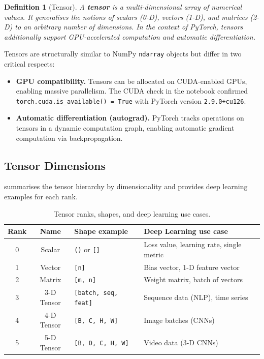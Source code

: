 \documentclass[12pt,a4paper]{article}
\newtheorem{definition}{Definition}[section]
\newcommand{\tbf}[1]{\textbf{#1}}
\newcommand{\ttt}[1]{\texttt{#1}}
\begin{document}
\begin{definition}[Tensor]
\label{def:tensor}
A \tbf{tensor} is a multi-dimensional array of numerical values. It generalises
the notions of scalars (0-D), vectors (1-D), and matrices (2-D) to an arbitrary
number of dimensions. In the context of PyTorch, tensors additionally support
GPU-accelerated computation and automatic differentiation.
\end{definition}

Tensors are structurally similar to NumPy \ttt{ndarray} objects but differ in
two critical respects:

\begin{itemize}[leftmargin=*]
  \item \tbf{GPU compatibility.} Tensors can be allocated on CUDA-enabled
        GPUs, enabling massive parallelism. The CUDA check in the notebook
        confirmed \texttt{torch.cuda.is\_available() = True} with PyTorch
        version \ttt{2.9.0+cu126}.
  \item \tbf{Automatic differentiation (autograd).} PyTorch tracks operations
        on tensors in a dynamic computation graph, enabling automatic
        gradient computation via backpropagation.
\end{itemize}

\subsection{Tensor Dimensions}

 summarises the tensor hierarchy by dimensionality and
provides deep learning examples for each rank.

\begin{table}[ht]
  \centering
  \caption{Tensor ranks, shapes, and deep learning use cases.}
  \label{tab:tensor-dims}
  \begin{tabularx}{\linewidth}{c c X X}
    \toprule
    \tbf{Rank} & \tbf{Name} & \tbf{Shape example} & \tbf{Deep Learning use case} \\
    \midrule
    0 & Scalar     & \ttt{()} or \ttt{[]}    & Loss value, learning rate, single metric \\
    1 & Vector     & \ttt{[n]}               & Bias vector, 1-D feature vector \\
    2 & Matrix     & \ttt{[m, n]}            & Weight matrix, batch of vectors \\
    3 & 3-D Tensor & \ttt{[batch, seq, feat]}& Sequence data (NLP), time series \\
    4 & 4-D Tensor & \ttt{[B, C, H, W]}      & Image batches (CNNs) \\
    5 & 5-D Tensor & \ttt{[B, D, C, H, W]}   & Video data (3-D CNNs) \\
    \bottomrule
  \end{tabularx}
\end{table}
\end{document}
